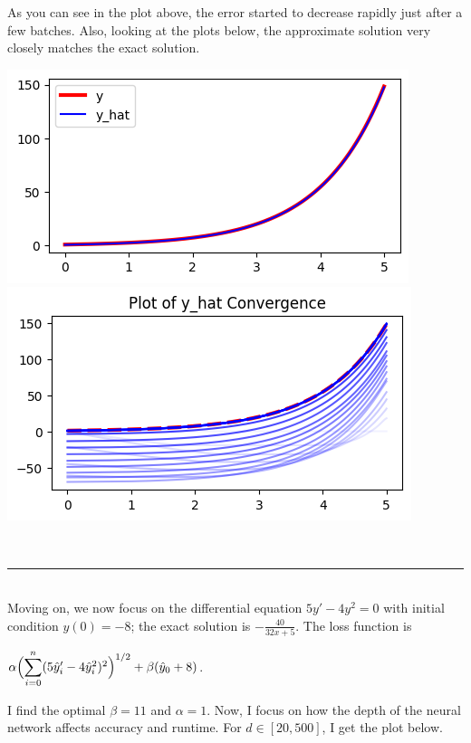 \documentclass[12pt]{article}
\newcommand{\dsum}[2]{\mathlarger{\sum}_{#1}^{#2}}
\newcommand{\bgc}{\begin{center}}
\newcommand{\enc}{\end{center}}
\begin{document}
\begin{description}
\begin{minipage}{\linewidth}
    \end{minipage}
    As you can see in the plot above, the error started to decrease rapidly
    just after a few batches. Also, looking at the plots below, the approximate
    solution very closely matches the exact solution. \\
    \begin{minipage}{\linewidth}
        \centering
        \includegraphics[scale=.5]{images/figure3.png}
        \includegraphics[scale=.5]{images/figure4.png}
    \end{minipage}
    \hfill \\
    \noindent\rule{15.5cm}{.4pt}
    \hfill \\
    Moving on, we now focus on the differential equation $5y' - 4y^2 = 0$ with
    initial condition $y(0) = -8$; the exact solution is $-\frac{40}{32x+5}$.
    The loss function is 
    \bgc 
    $\alpha\Bigl(\dsum{i=0}{n}(5\hat{y}_i' - 4\hat{y}_i^2)^2\Bigr)^{1/2} + \beta(\hat{y}_0 + 8)$.
    \enc
    I find the optimal $\beta = 11$ and $\alpha=1$. Now, I focus on how the
    depth of the neural network affects accuracy and runtime. For $d\in[20,
    500]$, I get the plot below.  \\ 
    \begin{minipage}{\linewidth}
        \centering

\end{minipage}
\end{description}
\end{document}

